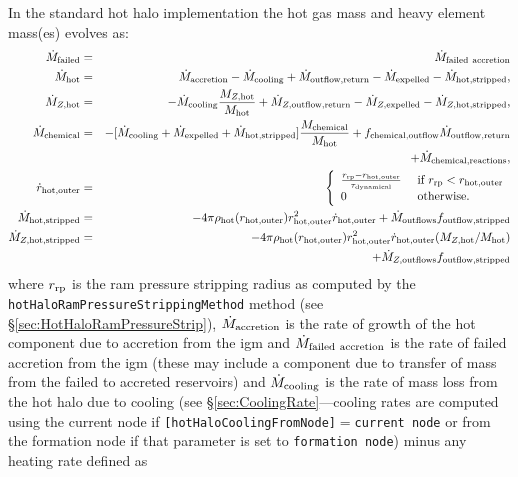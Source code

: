 In the standard hot halo implementation the hot gas mass and heavy element mass(es) evolves as:
\begin{eqnarray}
 \dot{M}_{\rm failed} &=& \dot{M}_{\rm failed~accretion} \\
 \dot{M}_{\rm hot} &=& \dot{M}_{\rm accretion} - \dot{M}_{\rm cooling} + \dot{M}_{\rm outflow,return} - \dot{M}_{\rm expelled} - \dot{M}_{\rm hot, stripped}, \\
 \dot{M}_{Z, {\rm hot}} &=& - \dot{M}_{\rm cooling} {M_{Z, {\rm hot}}\over M_{\rm hot}} + \dot{M}_{Z, {\rm outflow,return}} - \dot{M}_{Z,{\rm expelled}} - \dot{M}_{Z, {\rm hot, stripped}}, \\
 \dot{M}_{\rm chemical} &=& - [\dot{M}_{\rm cooling} + \dot{M}_{\rm expelled} + \dot{M}_{\rm hot, stripped}] {M_{\rm chemical}\over M_{\rm hot}} + f_{\rm chemical,outflow} \dot{M}_{\rm outflow,return} \nonumber \\ 
& & + \dot{M}_{\rm chemical,reactions}, \\
\dot{r}_{\rm hot, outer} &=& \left\{ \begin{array}{ll} {r_{\rm rp} - r_{\rm hot, outer} \over \tau_{\rm dynamical}} & \hbox{ if } r_{\rm rp} < r_{\rm hot, outer} \\ 0 & \hbox{ otherwise.} \end{array} \right. \\
\dot{M}_{\rm hot, stripped} &=& -4 \pi \rho_{\rm hot}(r_{\rm hot, outer}) r_{\rm hot, outer}^2 \dot{r}_{\rm hot, outer} + \dot{M}_{\rm outflows} f_{\rm outflow, stripped} \\
\dot{M}_{Z, {\rm hot, stripped}} &=& -4 \pi \rho_{\rm hot}(r_{\rm hot, outer}) r_{\rm hot, outer}^2 \dot{r}_{\rm hot, outer} (M_{Z, {\rm hot}} / M_{\rm hot}) \nonumber \\
 & & + \dot{M}_{Z, {\rm outflows}} f_{\rm outflow, stripped}  
\end{eqnarray}
where $r_{\rm rp}$ is the ram pressure stripping radius as computed by the {\tt hotHaloRamPressureStrippingMethod} method (see \S\ref{sec:HotHaloRamPressureStrip}), $\dot{M}_{\rm accretion}$ is the rate of growth of the hot \gls{component} due to accretion from the \gls{igm} and $\dot{M}_{\rm failed~accretion}$ is the rate of failed accretion from the \gls{igm} (these may include a \gls{component} due to transfer of mass from the failed to accreted reservoirs) and $\dot{M}_{\rm cooling}$ is the rate of mass loss from the hot halo due to cooling (see \S\ref{sec:CoolingRate}---cooling rates are computed using the current \gls{node} if {\tt [hotHaloCoolingFromNode]}$=${\tt current node} or from the formation \gls{node} if that parameter is set to {\tt formation node}) minus any heating rate defined as
